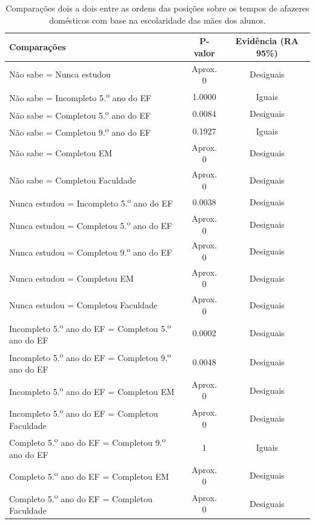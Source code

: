 \newpage
\begin{table}[htb]
    \centering
\caption{Comparações dois a dois entre as ordens das posições sobre os tempos de afazeres domésticos
com base na escolaridade das mães dos alunos.}
    \begin{tabular}{lcc}
    \toprule
    Comparações & P-valor & Evidência (RA 95\%)\\
    \midrule \midrule
    Não sabe = Nunca estudou & Aprox. 0 & Desiguais\\
    Não sabe = Incompleto 5.\textsuperscript{o} ano do EF  & 1.0000 & Iguais\\
    Não sabe = Completou 5.\textsuperscript{o} ano do EF  & 0.0084 & Desiguais\\
    Não sabe = Completou 9.\textsuperscript{o} ano do EF  & 0.1927 & Iguais\\
    Não sabe = Completou EM & Aprox. 0 & Desiguais\\
    Não sabe = Completou Faculdade & Aprox. 0 & Desiguais\\
    Nunca estudou = Incompleto 5.\textsuperscript{o} ano do EF  & 0.0038 & Desiguais\\
    Nunca estudou = Completou 5.\textsuperscript{o} ano do EF  & Aprox. 0 & Desiguais\\
    Nunca estudou = Completou 9.\textsuperscript{o} ano do EF  & Aprox. 0 & Desiguais\\
    Nunca estudou = Completou EM & Aprox. 0 & Desiguais\\
    Nunca estudou = Completou Faculdade & Aprox. 0 & Desiguais\\
    Incompleto 5.\textsuperscript{o} ano do EF = Completou 5.\textsuperscript{o} ano do EF  & 0.0002 & Desiguais\\
    Incompleto 5.\textsuperscript{o} ano do EF = Completou 9.\textsuperscript{o} ano do EF  & 0.0048 & Desiguais\\
    Incompleto 5.\textsuperscript{o} ano do EF = Completou EM & Aprox. 0 & Desiguais\\
    Incompleto 5.\textsuperscript{o} ano do EF = Completou Faculdade & Aprox. 0 & Desiguais\\
    Completo 5.\textsuperscript{o} ano do EF = Completou 9.\textsuperscript{o} ano do EF  & 1 & Iguais\\
    Completo 5.\textsuperscript{o} ano do EF = Completou EM & Aprox. 0 & Desiguais\\
    Completo 5.\textsuperscript{o} ano do EF = Completou Faculdade & Aprox. 0 & Desiguais\\

\end{tabular}
\end{table}

